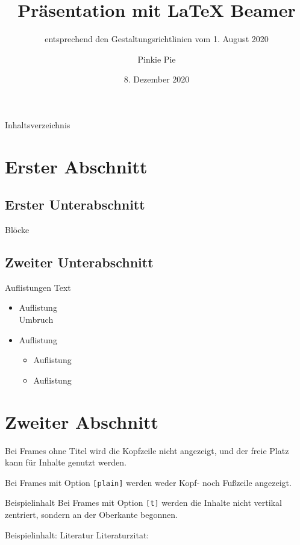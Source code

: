\documentclass{beamer}
\title[Beamer-Vorlage]{Präsentation mit \LaTeX{} Beamer}
\subtitle{entsprechend den Gestaltungsrichtlinien vom 1. August 2020}
\author[Pinkie Pie]{Pinkie Pie}
\date[8.\,12.\,2020]{8. Dezember 2020}
\begin{document}
\begin{frame}{Inhaltsverzeichnis}
\tableofcontents
\end{frame}

\section{Erster Abschnitt}

\subsection{Erster Unterabschnitt}
\begin{frame}{Blöcke}

\end{frame}
	  
\subsection{Zweiter Unterabschnitt}
\begin{frame}{Auflistungen}
	Text
	\begin{itemize}
		\item Auflistung\\ Umbruch
		\item Auflistung
		\begin{itemize}
			\item Auflistung
			\item Auflistung
		\end{itemize}
	\end{itemize}
\end{frame}

\section{Zweiter Abschnitt}

\begin{frame}
        Bei Frames ohne Titel wird die Kopfzeile nicht angezeigt, und  
    der freie Platz kann für Inhalte genutzt werden.
\end{frame}

\begin{frame}[plain]
    Bei Frames mit Option \texttt{[plain]} werden weder Kopf- noch Fußzeile angezeigt.
\end{frame}

\begin{frame}[t]{Beispielinhalt}
    Bei Frames mit Option \texttt{[t]} werden die Inhalte nicht vertikal zentriert, sondern an der Oberkante begonnen.
\end{frame}

\begin{frame}{Beispielinhalt: Literatur}
    Literaturzitat:
\end{frame}
\end{document}

